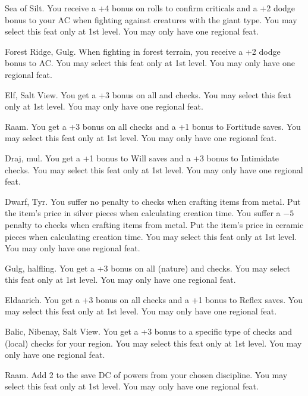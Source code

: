 {}
{Sea of Silt.}
{You receive a +4 bonus on rolls to confirm criticals and a +2 dodge bonus to your AC when fighting against creatures with the giant type.}
{}
{You may select this feat only at 1st level. You may only have one regional feat.}

{}
{Forest Ridge, Gulg.}
{When fighting in forest terrain, you receive a +2 dodge bonus to AC.}
{}
{You may select this feat only at 1st level. You may only have one regional feat.}

{}
{Elf, Salt View.}
{You get a +3 bonus on all  and  checks.}
{}
{You may select this feat only at 1st level. You may only have one regional feat.}

{}
{Raam.}
{You get a +3 bonus on all  checks and a +1 bonus to Fortitude saves.}
{}
{You may select this feat only at 1st level. You may only have one regional feat.}

{}
{Draj, mul.}
{You get a +1 bonus to Will saves and a +3 bonus to Intimidate checks.}
{}
{You may select this feat only at 1st level. You may only have one regional feat.}

{}
{Dwarf, Tyr.}
{You suffer no penalty to  checks when crafting items from metal. Put the item's price in silver pieces when calculating creation time.}
{You suffer a $-5$ penalty to  checks when crafting items from metal. Put the item's price in ceramic pieces when calculating creation time.}
{You may select this feat only at 1st level. You may only have one regional feat.}

{}
{Gulg, halfling.}
{You get a +3 bonus on all  (nature) and  checks.}
{}
{You may select this feat only at 1st level. You may only have one regional feat.}

{}
{Eldaarich.}
{You get a +3 bonus on all  checks and a +1 bonus to Reflex saves.}
{}
{You may select this feat only at 1st level. You may only have one regional feat.}

{}
{Balic, Nibenay, Salt View.}
{You get a +3 bonus to a specific type of  checks and  (local) checks for your region.}
{}
{You may select this feat only at 1st level. You may only have one regional feat.}

{}
{Raam.}
{Add 2 to the save DC of powers from your chosen discipline.}
{}
{You may select this feat only at 1st level. You may only have one regional feat.}